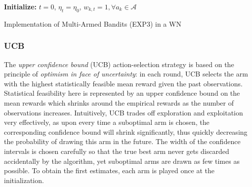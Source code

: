 \documentclass[preprint,12pt]{elsarticle}
\begin{document}
	\begin{algorithm}[H]	
		\SetAlgoLined
		\textbf{Initialize:} $t=0$, $\eta_t = \eta_0$, $w_{k,t} = 1, \forall a_k \in \mathcal{A}$\\
		\caption{Implementation of Multi-Armed Bandits (EXP3) in a WN}
		\label{alg:exp3}	
	\end{algorithm}
	
	\subsubsection{UCB}
	\label{section:bandits_ucb}		
	The \emph{upper confidence bound} (UCB) action-selection strategy \cite{Agr95,BuKa96,auer2002finite} is based on the principle of \emph{optimism in face of uncertainty}: in each round, UCB selects the arm with the highest statistically feasible mean reward given the past observations. Statistical feasibility here is represented by an upper confidence bound on the mean rewards which shrinks around the empirical rewards as the number of observations increases. Intuitively, UCB trades off exploration and exploitation very effectively, as upon every time a suboptimal arm is chosen, the corresponding confidence bound will shrink significantly, thus quickly decreasing the probability of drawing this arm in the future. The width of the confidence intervals is chosen carefully so that the true best arm never gets discarded accidentally by the algorithm, yet suboptimal arms are drawn as few times as possible. To obtain the first estimates, each arm is played once at the initialization. 
	
\end{document}
